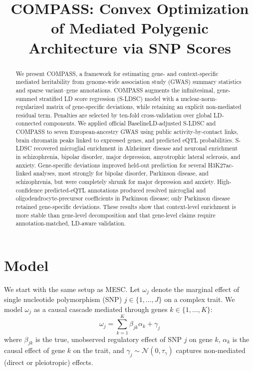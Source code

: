 \documentclass[11pt]{article}
\title{COMPASS: Convex Optimization of Mediated Polygenic Architecture via SNP Scores}
\author{}
\date{}
\begin{document}
\maketitle

\begin{abstract}
We present COMPASS, a framework for estimating gene- and context-specific mediated heritability from genome-wide association study (GWAS) summary statistics and sparse variant--gene annotations. COMPASS augments the infinitesimal, gene-summed stratified LD score regression (S-LDSC) model with a nuclear-norm-regularized matrix of gene-specific deviations, while retaining an explicit non-mediated residual term. Penalties are selected by ten-fold cross-validation over global LD-connected components. We applied official BaselineLD-adjusted S-LDSC and COMPASS to seven European-ancestry GWAS using public activity-by-contact links, brain chromatin peaks linked to expressed genes, and predicted eQTL probabilities. S-LDSC recovered microglial enrichment in Alzheimer disease and neuronal enrichment in schizophrenia, bipolar disorder, major depression, amyotrophic lateral sclerosis, and anxiety. Gene-specific deviations improved held-out prediction for several H3K27ac-linked analyses, most strongly for bipolar disorder, Parkinson disease, and schizophrenia, but were completely shrunk for major depression and anxiety. High-confidence predicted-eQTL annotations produced resolved microglial and oligodendrocyte-precursor coefficients in Parkinson disease; only Parkinson disease retained gene-specific deviations. These results show that context-level enrichment is more stable than gene-level decomposition and that gene-level claims require annotation-matched, LD-aware validation.
\end{abstract}

\section{Model}
We start with the same setup as MESC. Let $\omega_j$ denote the marginal effect of single nucleotide polymorphism (SNP) $j \in \{1, \dots, J\}$ on a complex trait. We model $\omega_j$ as a causal cascade mediated through genes $k \in \{1, \dots, K\}$:
\begin{equation}
    \omega_j = \sum_{k=1}^K \beta_{jk} \alpha_k + \gamma_j
\end{equation}
where $\beta_{jk}$ is the true, unobserved regulatory effect of SNP $j$ on gene $k$, $\alpha_k$ is the causal effect of gene $k$ on the trait, and $\gamma_j \sim \mathcal{N}(0, \tau_\gamma)$ captures non-mediated (direct or pleiotropic) effects. 
\end{document}
